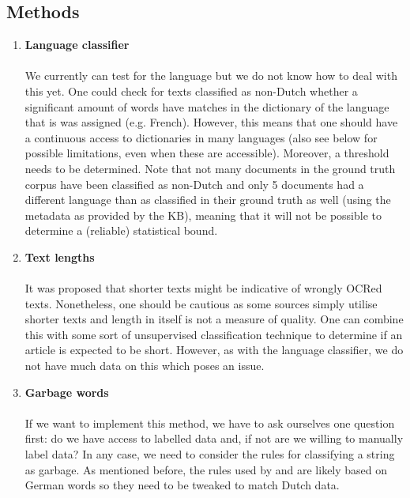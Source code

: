 \documentclass{article}
\begin{document}
	\subsection{Methods}
	\begin{enumerate}
		\item \textbf{Language classifier}
		\\ \\
		We currently can test for the language but we do not know how to deal with this yet. One could check for texts classified as non-Dutch whether a significant amount of words have matches in the dictionary of the language that is was assigned (e.g. French). However, this means that one should have a continuous access to dictionaries in many languages (also see below for possible limitations, even when these are accessible). Moreover, a threshold needs to be determined. Note that not many documents in the ground truth corpus have been classified as non-Dutch and only 5 documents had a different language than as classified in their ground truth as well (using the metadata as provided by the KB), meaning that it will not be possible to determine a (reliable) statistical bound.
		
		\item \textbf{Text lengths}
		\\ \\
		It was proposed that shorter texts might be indicative of wrongly OCRed texts. Nonetheless, one should be cautious as some sources simply utilise shorter texts and length in itself is not a measure of quality. One can combine this with some sort of unsupervised classification technique to determine if an article is expected to be short. However, as with the language classifier, we do not have much data on this which poses an issue.
		
		\item \textbf{Garbage words}
		\\ \\
		If we want to implement this method, we have to ask ourselves one question first: do we have access to labelled data and, if not are we willing to manually label data? In any case, we need to consider the rules for classifying a string as garbage. As mentioned before, the rules used by \cite{kulp2007retrieving} and \cite{wudtke2011recognizing} are likely based on German words so they need to be tweaked to match Dutch data.
		
		\newpage
		

\end{enumerate}
\end{document}
